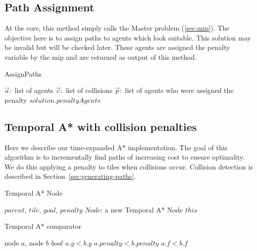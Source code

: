 \documentclass[a4paper,11pt]{article}
\let\oldReturn\Return
\renewcommand{\Return}{\State\oldReturn}
\begin{document}
\subsection{Path Assignment}
At the core, this method simply calls the Master problem (\ref{sec:mip}). The objective here is to assign paths to agents which look suitable. This solution may be invalid but will be checked later. These agents are assigned the penalty variable by the mip and are returned as output of this method.

\begin{algorithm}[H]
	\caption{AssignPaths}\label{alg:assignPaths}
	\begin{algorithmic}[1]
		\Require $\vec{a}:$ list of agents $\vec{c}:$ list of collisions
		\Ensure $\vec{p}:$ list of agents who were assigned the penalty
		\EndFor 
		\Return $solution.penaltyAgents$
	\end{algorithmic}
\end{algorithm}

\subsection{Temporal A* with collision penalties} \label{sec:temporalastar}
Here we describe our time-expanded A* implementation. The goal of this algorithm is to incrementally find paths of increasing cost to ensure optimality. We do this applying a penalty to tiles when collisions occur. Collision detection is described in Section~\ref{sec:generating-paths}.

\begin{algorithm}
	\caption{Temporal A* Node} \label{alg:temporalastar-node}
	\begin{algorithmic}[1]
		\Require $parent$, $tile$, $goal$, $penalty$
		\Ensure $Node$: a new Temporal A* Node
		\Else
		\EndIf
		\Return $this$
	\end{algorithmic}
\end{algorithm}

\begin{algorithm}
	\caption{Temporal A* comparator} \label{alg:temporalastarheur}
	\begin{algorithmic}[1]
		\Require node $a$, node $b$
		\Ensure $bool$
				\Return $a.g < b.g$
			\Else
				\Return $a.penalty < b.penalty$
			\EndIf
		\Else
			\Return $a.f < b.f$
		\EndIf
	\end{algorithmic}
\end{algorithm}
\end{document}
